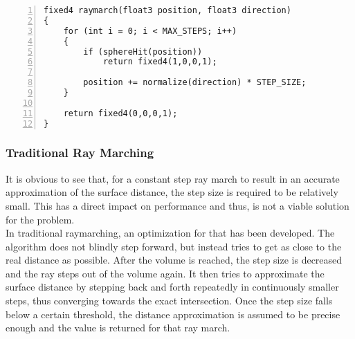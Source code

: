\begin{lstlisting}[language=HLSL, numbers=left, caption=Ray march function with constant step.,captionpos=b, label=lst:shader:raymarch:constantstep]
fixed4 raymarch(float3 position, float3 direction)
{
    for (int i = 0; i < MAX_STEPS; i++)
    {
        if (sphereHit(position))
            return fixed4(1,0,0,1);
        
        position += normalize(direction) * STEP_SIZE;
    }
    
    return fixed4(0,0,0,1);
}
\end{lstlisting}


\pagebreak
\subsubsection{Traditional Ray Marching}
It is obvious to see that, for a constant step ray march to result in an accurate approximation of the surface distance, the step size is required to be relatively small.
This has a direct impact on performance and thus, is not a viable solution for the problem.
\\
In traditional \gls{raymarching}, an optimization for that has been developed. The algorithm does not blindly step forward, but instead tries to get as close to the real distance as possible.
After the volume is reached, the step size is decreased and the ray steps out of the volume again. It then tries to approximate the surface distance by stepping back and forth repeatedly in continuously smaller steps, thus converging towards the exact intersection.
Once the step size falls below a certain threshold, the distance approximation is assumed to be precise enough and the value is returned for that ray march.

